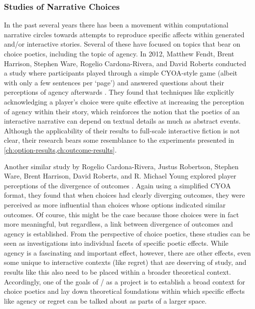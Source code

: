 


\subsubsection{Studies of Narrative Choices}

In the past several years there has been a movement within computational narrative circles towards attempts to reproduce specific affects within generated and/or interactive stories.
%
Several of these have focused on topics that bear on choice poetics, including the topic of agency.
%
In 2012, Matthew Fendt, Brent Harrison, Stephen Ware, Rogelio Cardona-Rivera, and David Roberts conducted a study where participants played through a simple CYOA-style game (albeit with only a few sentences per `page') and answered questions about their perceptions of agency afterwards \citep{Fendt2012}.
%
They found that techniques like explicitly acknowledging a player's choice were quite effective at increasing the perception of agency within their story, which reinforces the notion that the poetics of an interactive narrative can depend on textual details as much as abstract events.
%
Although the applicability of their results to full-scale interactive fiction is not clear, their research bears some resemblance to the experiments presented in \cref{ch:option-results,ch:outcome-results}.


Another similar study by Rogelio Cardona-Rivera, Justus Robertson, Stephen Ware, Brent Harrison, David Roberts, and R. Michael Young explored player perceptions of the divergence of outcomes \citep{Cardona-Rivera2014}.
%
Again using a simplified CYOA format, they found that when choices had clearly diverging outcomes, they were perceived as more influential than choices whose options indicated similar outcomes.
%
Of course, this might be the case because those choices were in fact more meaningful, but regardless, a link between divergence of outcomes and agency is established.
%
From the perspective of choice poetics, these studies can be seen as investigations into individual facets of specific poetic effects.
%
While agency is a fascinating and important effect, however, there are other effects, even some unique to interactive contexts (like regret) that are deserving of study, and results like this also need to be placed within a broader theoretical context.
%
Accordingly, one of the goals of \dunyazad/ as a project is to establish a broad context for choice poetics and lay down theoretical foundations within which specific effects like agency or regret can be talked about as parts of a larger space.


